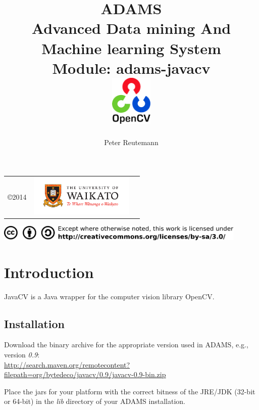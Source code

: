 \documentclass[a4paper]{book}
\title{
  \textbf{ADAMS} \\
  {\Large \textbf{A}dvanced \textbf{D}ata mining \textbf{A}nd \textbf{M}achine
  learning \textbf{S}ystem} \\
  {\Large Module: adams-javacv} \\
  \vspace{1cm}
  \includegraphics[width=2cm]{images/javacv-module.png} \\
}
\author{
  Peter Reutemann
}
\begin{document}
\begin{titlepage}
\maketitle

\thispagestyle{empty}
\center
\begin{table}[b]
	\begin{tabular}{c l l}
		\parbox[c][2cm]{2cm}{\copyright 2014} &
		\parbox[c][2cm]{5cm}{\includegraphics[width=5cm]{images/coat_of_arms.pdf}} \\
	\end{tabular}
	\includegraphics[width=12cm]{images/cc.png} \\
\end{table}

\end{titlepage}

\tableofcontents


\chapter{Introduction}
JavaCV\cite{javacv} is a Java wrapper for the computer vision library 
OpenCV\cite{opencv}.

\section{Installation}
Download the binary archive for the appropriate version used in ADAMS, e.g.,
version \textit{0.9}: \\
\url{http://search.maven.org/remotecontent?filepath=org/bytedeco/javacv/0.9/javacv-0.9-bin.zip}{}

Place the jars for your platform with the correct bitness of the JRE/JDK 
(32-bit or 64-bit) in the \textit{lib} directory of your ADAMS installation.


\end{document}
